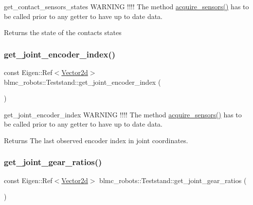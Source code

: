 get\+\_\+contact\+\_\+sensors\+\_\+states W\+A\+R\+N\+I\+NG !!!! The method \hyperlink{classblmc__robots_1_1Teststand_a4203e25148ab5b4ddfef3b46647213c6}{acquire\+\_\+sensors()} has to be called prior to any getter to have up to date data. 

\begin{DoxyReturn}{Returns}
the state of the contacts states 
\end{DoxyReturn}
\mbox{\label{classblmc__robots_1_1Teststand_a2fa7aacb213c7898bb04f791ca3687d1}} 
\subsubsection{\texorpdfstring{get\+\_\+joint\+\_\+encoder\+\_\+index()}{get\_joint\_encoder\_index()}}
{\footnotesize\ttfamily const Eigen\+::\+Ref$<$\hyperlink{common__header_8hpp_acb6916bc8c9fe9d98c484fd4cc201447}{Vector2d}$>$ blmc\+\_\+robots\+::\+Teststand\+::get\+\_\+joint\+\_\+encoder\+\_\+index (\begin{DoxyParamCaption}{ }\end{DoxyParamCaption})\hspace{0.3cm}{\ttfamily [inline]}}



get\+\_\+joint\+\_\+encoder\+\_\+index W\+A\+R\+N\+I\+NG !!!! The method \hyperlink{classblmc__robots_1_1Teststand_a4203e25148ab5b4ddfef3b46647213c6}{acquire\+\_\+sensors()} has to be called prior to any getter to have up to date data. 

\begin{DoxyReturn}{Returns}
The last observed encoder index in joint coordinates. 
\end{DoxyReturn}
\mbox{\label{classblmc__robots_1_1Teststand_a7def64b82a1cb58c9ae8c9c54bcaa887}} 
\subsubsection{\texorpdfstring{get\+\_\+joint\+\_\+gear\+\_\+ratios()}{get\_joint\_gear\_ratios()}}
{\footnotesize\ttfamily const Eigen\+::\+Ref$<$\hyperlink{common__header_8hpp_acb6916bc8c9fe9d98c484fd4cc201447}{Vector2d}$>$ blmc\+\_\+robots\+::\+Teststand\+::get\+\_\+joint\+\_\+gear\+\_\+ratios (\begin{DoxyParamCaption}{ }\end{DoxyParamCaption})\hspace{0.3cm}{\ttfamily [inline]}}



